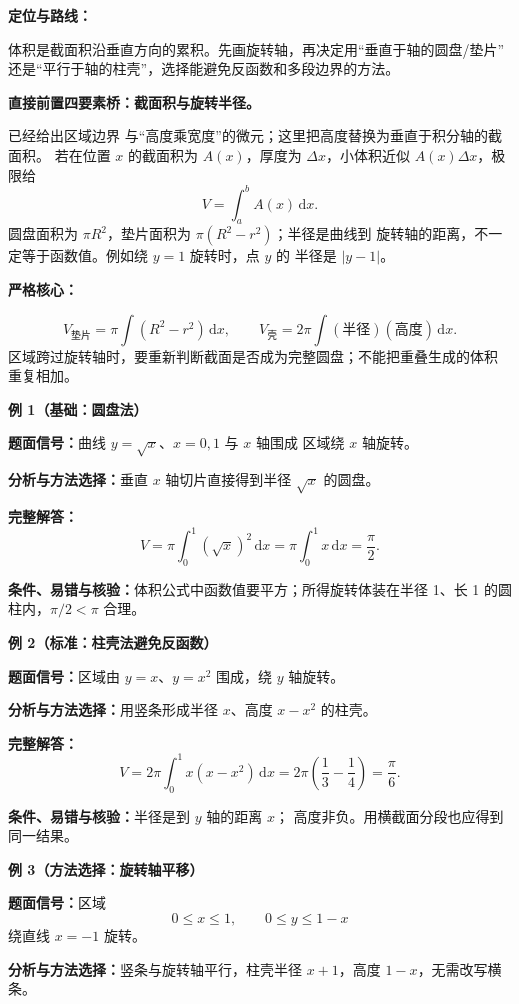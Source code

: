 \begin{knowledgeBox}
\textbf{定位与路线：}

体积是截面积沿垂直方向的累积。先画旋转轴，再决定用“垂直于轴的圆盘/垫片”
还是“平行于轴的柱壳”，选择能避免反函数和多段边界的方法。

\textbf{直接前置四要素桥：截面积与旋转半径。}

已经给出区域边界
与“高度乘宽度”的微元；这里把高度替换为垂直于积分轴的截面积。
若在位置 \(x\) 的截面积为 \(A(x)\)，厚度为 \(\Delta x\)，小体积近似
\(A(x)\Delta x\)，极限给
\[
V=\int_a^bA(x)\,\mathrm dx.
\]
圆盘面积为 \(\pi R^2\)，垫片面积为 \(\pi(R^2-r^2)\)；半径是曲线到
旋转轴的距离，不一定等于函数值。例如绕 \(y=1\) 旋转时，点 \(y\) 的
半径是 \(|y-1|\)。

\textbf{严格核心：}

\[
V_{\text{垫片}}=\pi\int(R^2-r^2)\,\mathrm dx,
\qquad
V_{\text{壳}}=2\pi\int(\text{半径})(\text{高度})\,\mathrm dx.
\]
区域跨过旋转轴时，要重新判断截面是否成为完整圆盘；不能把重叠生成的体积
重复相加。

\textbf{例 1（基础：圆盘法）}

\textbf{题面信号：}曲线 \(y=\sqrt x\)、\(x=0,1\) 与 \(x\) 轴围成
区域绕 \(x\) 轴旋转。

\textbf{分析与方法选择：}垂直 \(x\) 轴切片直接得到半径 \(\sqrt x\)
的圆盘。

\textbf{完整解答：}
\[
V=\pi\int_0^1(\sqrt x)^2\,\mathrm dx
=\pi\int_0^1x\,\mathrm dx=\frac\pi2.
\]

\textbf{条件、易错与核验：}体积公式中函数值要平方；所得旋转体装在半径
1、长 1 的圆柱内，\(\pi/2<\pi\) 合理。

\textbf{例 2（标准：柱壳法避免反函数）}

\textbf{题面信号：}区域由 \(y=x\)、\(y=x^2\) 围成，绕 \(y\) 轴旋转。

\textbf{分析与方法选择：}用竖条形成半径 \(x\)、高度 \(x-x^2\) 的柱壳。

\textbf{完整解答：}
\[
V=2\pi\int_0^1x(x-x^2)\,\mathrm dx
=2\pi\left(\frac13-\frac14\right)=\frac\pi6.
\]

\textbf{条件、易错与核验：}半径是到 \(y\) 轴的距离 \(x\)；
高度非负。用横截面分段也应得到同一结果。

\textbf{例 3（方法选择：旋转轴平移）}

\textbf{题面信号：}区域
\[
0\le x\le1,\qquad0\le y\le1-x
\]
绕直线 \(x=-1\) 旋转。

\textbf{分析与方法选择：}竖条与旋转轴平行，柱壳半径 \(x+1\)，高度
\(1-x\)，无需改写横条。


\end{knowledgeBox}
